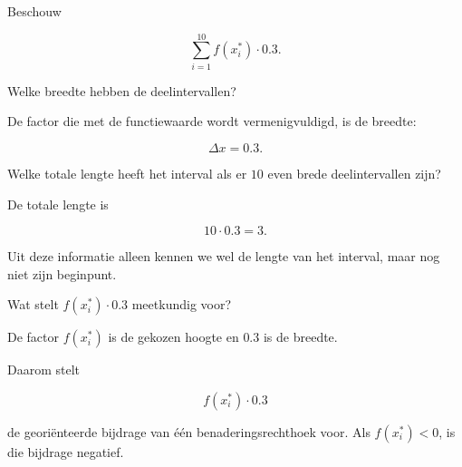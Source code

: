 \documentclass{ximera}
\begin{document}

\begin{oefening}{\oefB\ESS}

Beschouw

\[
\sum_{i=1}^{10} f(x_i^\ast)\cdot0.3.
\]

\begin{question}
Welke breedte hebben de deelintervallen?

\begin{oplossing}
De factor die met de functiewaarde wordt vermenigvuldigd, is de breedte:

\[
\boxed{\Delta x=0.3}.
\]
\end{oplossing}
\end{question}

\begin{question}
Welke totale lengte heeft het interval als er \(10\) even brede
deelintervallen zijn?

\begin{oplossing}
De totale lengte is

\[
10\cdot0.3=\boxed{3}.
\]

Uit deze informatie alleen kennen we wel de lengte van het interval,
maar nog niet zijn beginpunt.
\end{oplossing}
\end{question}

\begin{question}
Wat stelt \(f(x_i^\ast)\cdot0.3\) meetkundig voor?

\begin{oplossing}
De factor \(f(x_i^\ast)\) is de gekozen hoogte en \(0.3\) is de breedte.

Daarom stelt

\[
f(x_i^\ast)\cdot0.3
\]

de georiënteerde bijdrage van één benaderingsrechthoek voor. Als
\(f(x_i^\ast)<0\), is die bijdrage negatief.
\end{oplossing}
\end{question}

\end{oefening}


\end{document}
